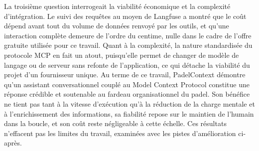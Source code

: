 \documentclass[12pt]{article}
\begin{document}
\newline\newline
La troisième question interrogeait la viabilité économique et la complexité d'intégration. Le suivi des requêtes au moyen de Langfuse a montré que le coût dépend avant tout du volume de données renvoyé par les outils, et qu'une interaction complète demeure de l'ordre du centime, nulle dans le cadre de l'offre gratuite utilisée pour ce travail. Quant à la complexité, la nature standardisée du protocole MCP en fait un atout, puisqu'elle permet de changer de modèle de langage ou de serveur sans refonte de l'application, ce qui détache la viabilité du projet d'un fournisseur unique.
\newline\newline
Au terme de ce travail, PadelContext démontre qu'un assistant conversationnel couplé au Model Context Protocol constitue une réponse crédible et soutenable au fardeau organisationnel du padel. Son bénéfice ne tient pas tant à la vitesse d'exécution qu'à la réduction de la charge mentale et à l'enrichissement des informations, sa fiabilité repose sur le maintien de l'humain dans la boucle, et son coût reste négligeable à cette échelle. Ces résultats n'effacent pas les limites du travail, examinées avec les pistes d'amélioration ci-après.
\end{document}
